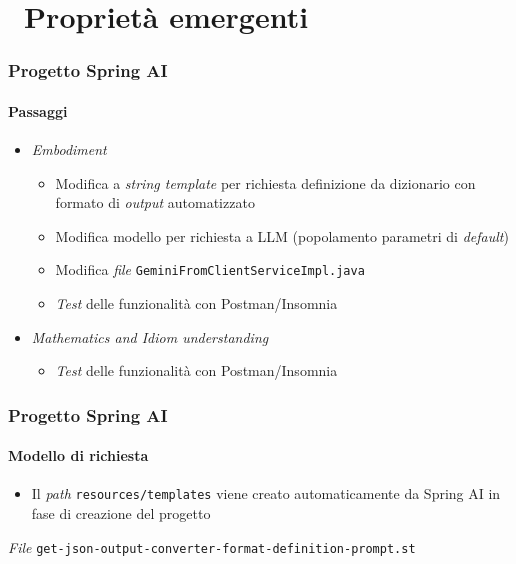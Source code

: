 \section{\faWrench\ Proprietà emergenti} %
\label{sec:spring-ai-gemini-emerging-capabilities}
%
\begin{frame}[t,fragile] \frametitle{Progetto Spring AI}
    \framesubtitle{Passaggi}
    {\small
    \begin{itemize}[leftmargin=10pt,align=right]
        \item[\alert{\faArrowCircleRight}] \textit{Embodiment}
        \begin{itemize}[leftmargin=10pt,align=right]
		    \item[\alertedcircled{1}] Modifica a \textit{string template} per richiesta definizione da dizionario con formato di \textit{output} automatizzato
		    \item[\alertedcircled{2}] Modifica modello per richiesta a LLM (popolamento parametri di \textit{default})
            \item[\alertedcircled{3}] Modifica \textit{file} \texttt{GeminiFromClientServiceImpl.java}
            \item[\alertedcircled{4}] \textit{Test} delle funzionalità con Postman/Insomnia
        \end{itemize}
        \item[\alert{\faArrowCircleRight}] \textit{Mathematics and Idiom understanding}
        \begin{itemize}[leftmargin=10pt,align=right]
            \item[\alertedcircled{1}] \textit{Test} delle funzionalità con Postman/Insomnia
        \end{itemize}
    \end{itemize}
    }
\end{frame}
%
\begin{frame}[t,fragile] \frametitle{Progetto Spring AI}
    \framesubtitle{Modello di richiesta}
        \begin{itemize}[leftmargin=10pt,align=right]
		    \item[\alert{\faExclamationTriangle}] Il \textit{path} \texttt{resources/templates} viene creato automaticamente da Spring AI in fase di creazione del progetto
        \end{itemize}
        \begin{block}{\textit{File} \texttt{get-json-output-converter-format-definition-prompt.st}}
			{\scriptsize}
    	\end{block}
\end{frame}
